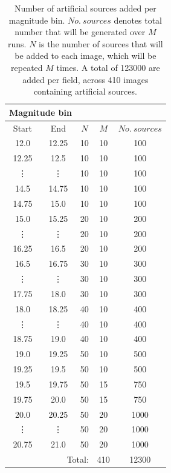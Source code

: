 \documentclass[a4paper,useAMS,usenatbib]{mn2e}
\begin{document}
\begin{table}
\begin{center}
\begin{tabular}{|c|c|c|c|c|}
\hline
\multicolumn{2}{|c|}{Magnitude bin} & & & \\ \hline
Start & End & $N$ & $M$ & $No.\ sources$ \\ \hline
12.0 & 12.25 & 10 & 10 & 100 \\
12.25 & 12.5 & 10 & 10 & 100 \\[-1.5mm]
\vdots & \vdots & 10 & 10 & 100 \\
14.5 & 14.75 & 10 & 10 & 100 \\
14.75 & 15.0 & 10 & 10 & 100 \\ 
15.0 & 15.25 & 20 & 10 & 200 \\[-1.5mm]
\vdots & \vdots & 20 & 10 & 200 \\
16.25 & 16.5 & 20 & 10 & 200 \\
16.5 & 16.75 & 30 & 10 & 300 \\[-1.5mm]
\vdots & \vdots & 30 & 10 & 300 \\
17.75 & 18.0 & 30 & 10 & 300 \\
18.0 & 18.25 & 40 & 10 & 400 \\[-1.5mm]
\vdots & \vdots & 40 & 10 & 400 \\
18.75 & 19.0 & 40 & 10 & 400 \\
19.0 & 19.25 & 50 & 10 & 500 \\
19.25 & 19.5 & 50 & 10 & 500 \\
19.5 & 19.75 & 50 & 15 & 750 \\
19.75 & 20.0 & 50 & 15 & 750 \\
20.0 & 20.25 & 50 & 20 & 1000 \\[-1.5mm]
\vdots & \vdots & 50 & 20 & 1000 \\
20.75 & 21.0 & 50 & 20 & 1000 \\\hline
\multicolumn{3}{|r|}{Total:} & 410 & 12300 \\\hline
\end{tabular}
\caption{\footnotesize Number of artificial sources added per magnitude bin. $No.\ sources$ denotes total number that will be generated over $M$ runs. $N$ is the number of sources that will be added to each image, which will be repeated $M$ times. A total of 123000 are added per field, across 410 images containing artificial sources.}
\label{table:number_artificial}
\end{center}
\end{table}
\end{document}
